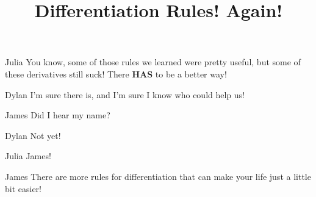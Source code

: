 \documentclass{ximera}
\title{Differentiation Rules! Again!}
\begin{document}
\maketitle
\begin{dialogue}
\item[Julia] You know, some of those rules we learned were pretty useful, but some of these derivatives still suck! There \textbf{HAS} to be a better way!
\item[Dylan] I'm sure there is, and I'm sure I know who could help us!
\item[James] Did I hear my name?
\item[Dylan] Not yet!
\item[Julia] James!
\item[James] There are more rules for differentiation that can make your life just a little bit easier!
\end{dialogue}
\end{document}
